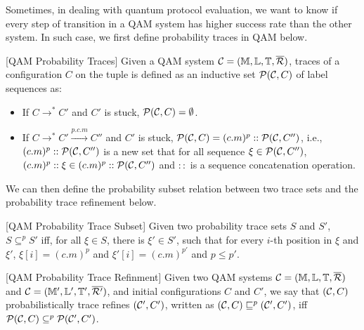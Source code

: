 Sometimes, in dealing with quantum protocol evaluation, we want to know if every step of transition in a QAM system has higher success rate than the other system. In such case, we first define probability traces in QAM below.

\begin{definition}\label{def:ptraces}\rm[QAM Probability Traces]
Given a QAM system $\mathcal{C}=(\mathbb{M},\mathbb{L},\mathbb{T},\overline{\mathcal{R}})$, traces of a configuration $C$ on the tuple is defined as an inductive set $\mathcal{P}(\mathcal{C},C)$ of label sequences as:

\begin{itemize}
\item If $C \longrightarrow^* C'$ and $C'$ is stuck, $\mathcal{P}(\mathcal{C},C)=\emptyset$.
\item If $C \longrightarrow^* C' \xrightarrow{p.c.m} C''$ and $C'$ is stuck, $\mathcal{P}(\mathcal{C},C)=(c.m)^p::\mathcal{P}(\mathcal{C},C'')$, i.e., $(c.m)^p::\mathcal{P}(\mathcal{C},C'')$ is a new set that for all sequence $\xi \in \mathcal{P}(\mathcal{C},C'')$, $(c.m)^p::\xi \in (c.m)^p::\mathcal{P}(\mathcal{C},C'')$ and $::$ is a sequence concatenation operation.
\end{itemize}
\end{definition}

We can then define the probability subset relation between two trace sets and the probability trace refinement below.

\begin{definition}\label{def:ptracesub}\rm[QAM Probability Trace Subset]
Given two probability trace sets $S$ and $S'$, $S \subseteq^p S'$ iff, for all $\xi \in S$, there is $\xi' \in S'$, such that for every $i$-th position in $\xi$ and $\xi'$, $\xi[i]=(c.m)^p$ and $\xi'[i]=(c.m)^{p'}$ and $p \le p'$.

\end{definition}

\begin{definition}\label{def:ptracerefine}\rm[QAM Probability Trace Refinment]
Given two QAM systems $\mathcal{C}=(\mathbb{M},\mathbb{L},\mathbb{T},\overline{\mathcal{R}})$ and $\mathcal{C}=(\mathbb{M}',\mathbb{L}',\mathbb{T}',\overline{\mathcal{R}'})$, and initial configurations $C$ and $C'$,  we say that $(\mathcal{C},C)$ probabilistically trace refines $(\mathcal{C}',C')$, written as $(\mathcal{C},C) \sqsubseteq^p (\mathcal{C}',C')$, iff $\mathcal{P}(\mathcal{C},C)\subseteq^p \mathcal{P}(\mathcal{C}',C')$.

\end{definition}




